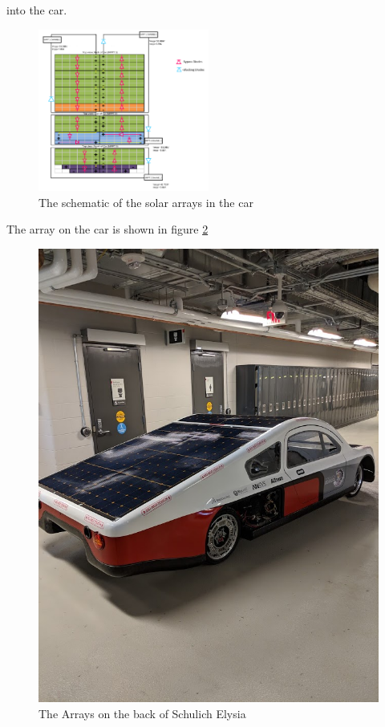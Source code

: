\documentclass[titlepage]{article}
\begin{document}
    into the car.
    \begin{figure}[H]
        \centering
        \includegraphics[width=0.5\textwidth]{images/array_schem.png}
        \caption{The schematic of the solar arrays in the car}
        \label{fig:arr_schem}
    \end{figure}
    \noindent The array on the car is shown in figure \ref{fig:array}
    \begin{figure}[H]
        \centering
        \includegraphics[width=\textwidth]{images/array.jpg}
        \caption{The Arrays on the back of Schulich Elysia}
        \label{fig:array}
    \end{figure}
\end{document}
